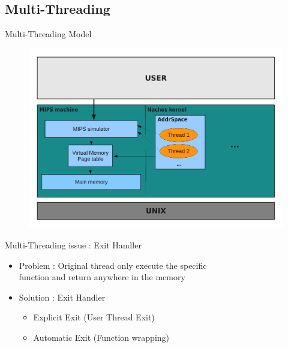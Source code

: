 \documentclass{beamer}
\begin{document}
\subsection{Multi-Threading}
\begin{frame}{Multi-Threading Model}
    \begin{figure}[ht]
        \includegraphics[width=0.8\linewidth]{threadschema.pdf}
    \end{figure}
\end{frame}

\begin{frame}{Multi-Threading issue : Exit Handler}
    \begin{itemize}
        \item Problem : Original thread only execute the specific 
            \\function and return anywhere in the memory 
        \item Solution : Exit Handler
            \begin{itemize}
                \item Explicit Exit (User Thread Exit)
                \item Automatic Exit (Function wrapping)
            \end{itemize}
    \end{itemize}
\end{frame}
\end{document}
